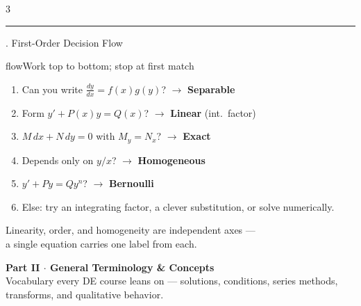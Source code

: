 \documentclass[10pt]{article}
\newcommand{\dydx}{\frac{dy}{dx}}
\newcommand{\sect}[2]{%
  \begin{tcolorbox}[blanker, breakable, before skip=2pt, after skip=2pt]
    \begingroup\sffamily\bfseries\normalsize\color{#1}%
    {\color{#1}\rule[-1pt]{3pt}{12pt}}\;#2\endgroup
    \par\vspace{1pt}{\color{#1}\hrule height 1pt}
\end{tcolorbox}}
\begin{document}
\begin{multicols}{3}
  \sect{flow}{4.\; First-Order Decision Flow}

  \begin{card}{flow}{Work top to bottom; stop at first match}
    \begin{enumerate}[leftmargin=1.4em]
      \item Can you write \(\dydx=f(x)g(y)\)? \(\to\) \textbf{Separable}
      \item Form \(y'+P(x)y=Q(x)\)? \(\to\) \textbf{Linear} (int.\ factor)
      \item \(M\,dx+N\,dy=0\) with \(M_{y}=N_{x}\)? \(\to\) \textbf{Exact}
      \item Depends only on \(y/x\)? \(\to\) \textbf{Homogeneous}
      \item \(y'+Py=Qy^{n}\)? \(\to\) \textbf{Bernoulli}
      \item Else: try an integrating factor, a clever substitution, or solve numerically.
    \end{enumerate}
  \end{card}

  \begin{tcolorbox}[blanker,before skip=4pt]
    \centering\footnotesize\color{ink!70}
    \sffamily Linearity, order, and homogeneity are independent axes ---\\
    a single equation carries one label from each.
  \end{tcolorbox}

\end{multicols}

\newpage

\begin{tcolorbox}[enhanced, colback=ink, colframe=ink, sharp corners,
  boxrule=0pt, left=12pt, right=12pt, top=5pt, bottom=5pt]
  \color{white}
  {\sffamily\bfseries\LARGE Part II \textmd{\large \(\cdot\) General Terminology \& Concepts}}\\[2pt]
  {\sffamily\footnotesize Vocabulary every DE course leans on --- solutions, conditions, series methods, transforms, and qualitative behavior.}
\end{tcolorbox}
\vspace{2pt}
\end{document}
